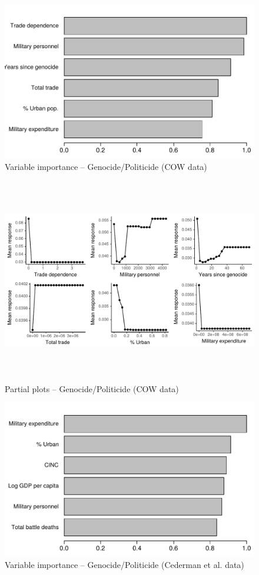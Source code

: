 \begin{figure}[H]
    \centering
    \includegraphics{images/drf-gp2.pdf}
    \caption{Variable importance -- Genocide/Politicide (COW data)}
    \label{fig:my_label}
\end{figure}

\begin{figure}[H]
    \centering
    \includegraphics[width=\textwidth, height=9cm]{images/drfdpp6a.pdf}
    \caption{Partial plots -- Genocide/Politicide (COW data)}
    \label{fig:my_label}
\end{figure}

\begin{figure}[H]
    \centering
    \includegraphics{images/drf-gp3.pdf}
    \caption{Variable importance -- Genocide/Politicide (Cederman et al. data)}
    \label{fig:my_label}
\end{figure}


